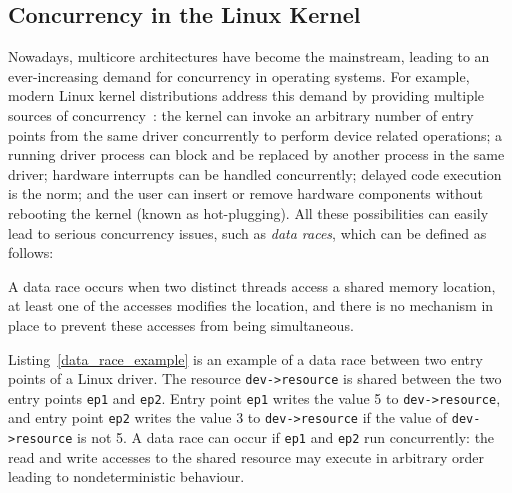 \subsection{Concurrency in the Linux Kernel}
\label{concurrency}

Nowadays, multicore architectures have become the mainstream, leading to an ever-increasing demand for concurrency in operating systems. For example, modern Linux kernel distributions address this demand by providing multiple sources of concurrency~\cite{corbet2005linux}: the kernel can invoke an arbitrary number of entry points from the same driver concurrently to perform device related operations; a running driver process can block and be replaced by another process in the same driver; hardware interrupts can be handled concurrently; delayed code execution is the norm; and the user can insert or remove hardware components without rebooting the kernel (known as hot-plugging). All these possibilities can easily lead to serious concurrency issues, such as \emph{data races}, which can be defined as follows:

\begin{definition}
\label{definition:datarace}
A data race occurs when two distinct threads access a shared memory location, at least one of the accesses modifies the location, and there is no mechanism in place to prevent these accesses from being simultaneous.
\end{definition}

Listing~\ref{data_race_example} is an example of a data race between two entry points of a Linux driver. The resource \texttt{dev->resource} is shared between the two entry points \texttt{ep1} and \texttt{ep2}. Entry point \texttt{ep1} writes the value 5 to \texttt{dev->resource}, and entry point \texttt{ep2} writes the value 3 to \texttt{dev->resource} if the value of \texttt{dev->resource} is not 5. A data race can occur if \texttt{ep1} and \texttt{ep2} run concurrently: the read and write accesses to the shared resource may execute in arbitrary order leading to nondeterministic behaviour.

